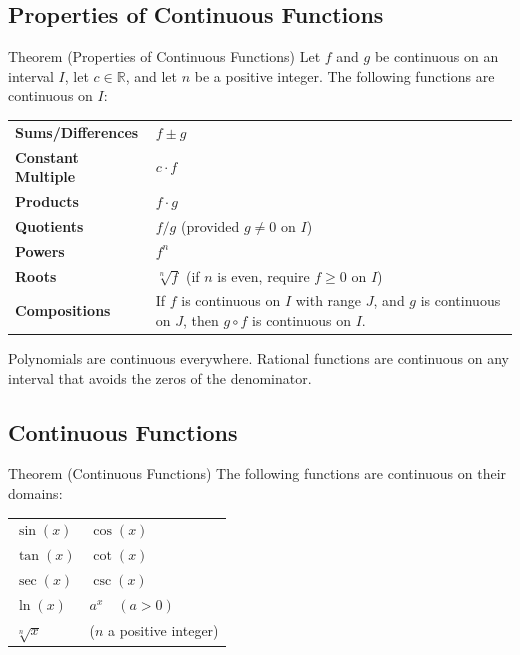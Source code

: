 \subsection*{Properties of Continuous Functions}

\begin{theorembox}{Theorem (Properties of Continuous Functions)}
Let $f$ and $g$ be continuous on an interval $I$, let $c \in \mathbb{R}$,
and let $n$ be a positive integer.
The following functions are continuous on $I$:

\medskip
\begin{tabular}{@{}p{}p{}@{}}
\textbf{Sums/Differences}  & $f \pm g$ \\[6pt]
\textbf{Constant Multiple} & $c \cdot f$ \\[6pt]
\textbf{Products}          & $f \cdot g$ \\[6pt]
\textbf{Quotients}         & $f/g$ \quad (provided $g \neq 0$ on $I$) \\[6pt]
\textbf{Powers}            & $f^n$ \\[6pt]
\textbf{Roots}             & $\sqrt[n]{f}$ \quad (if $n$ is even, require $f \geq 0$ on $I$) \\[6pt]
\textbf{Compositions}      & If $f$ is continuous on $I$ with range $J$, and $g$ is
                             continuous on $J$, then $g \circ f$ is continuous on $I$.
\end{tabular}
\end{theorembox}

\begin{remark*}
Polynomials are continuous everywhere.
Rational functions are continuous on any interval that avoids the
zeros of the denominator.
\end{remark*}

\subsection*{Continuous Functions}

\begin{theorembox}{Theorem (Continuous Functions)}
The following functions are continuous on their domains:

\medskip
\begin{tabular}{@{}p{}p{}@{}}
$\sin(x)$     & $\cos(x)$           \\[4pt]
$\tan(x)$     & $\cot(x)$           \\[4pt]
$\sec(x)$     & $\csc(x)$           \\[4pt]
$\ln(x)$      & $a^x \quad (a > 0)$ \\[4pt]
$\sqrt[n]{x}$ & ($n$ a positive integer) \\
\end{tabular}
\end{theorembox}

